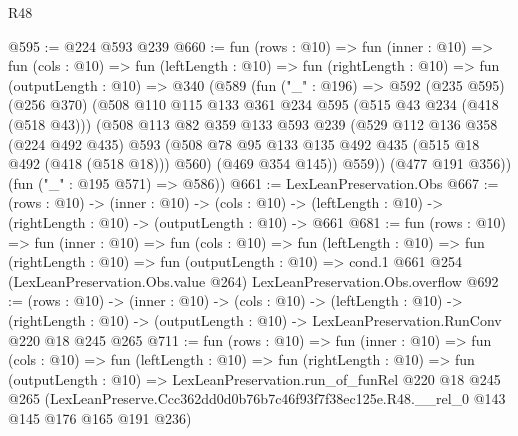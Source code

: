 \begin{lexlean}{R48}
\begin{coremodule}
@595 := @224 @593 @239
@660 := fun (rows : @10) =>
  fun (inner : @10) =>
  fun (cols : @10) =>
  fun (leftLength : @10) =>
  fun (rightLength : @10) =>
  fun (outputLength : @10) =>
  @340
    (@589
      (fun ("_" : @196) =>
      @592
        (@235 @595)
        (@256 @370)
        (@508
          @110
          @115
          @133
          @361
          @234
          @595
          (@515 @43 @234 (@418 (@518 @43)))
          (@508
            @113
            @82
            @359
            @133
            @593
            @239
            (@529
              @112
              @136
              @358
              (@224 @492 @435)
              @593
              (@508 @78 @95 @133 @135 @492 @435 (@515 @18 @492 (@418 (@518 @18))) @560)
              (@469 @354 @145))
            @559))
        (@477 @191 @356))
      (fun ("_" : @195 @571) => @586))
@661 := LexLeanPreservation.Obs
@667 := (rows : @10) ->
  (inner : @10) ->
  (cols : @10) -> (leftLength : @10) -> (rightLength : @10) -> (outputLength : @10) -> @661
@681 := fun (rows : @10) =>
  fun (inner : @10) =>
  fun (cols : @10) =>
  fun (leftLength : @10) =>
  fun (rightLength : @10) =>
  fun (outputLength : @10) =>
  cond.{1} @661 @254 (LexLeanPreservation.Obs.value @264) LexLeanPreservation.Obs.overflow
@692 := (rows : @10) ->
  (inner : @10) ->
  (cols : @10) ->
  (leftLength : @10) ->
  (rightLength : @10) -> (outputLength : @10) -> LexLeanPreservation.RunConv @220 @18 @245 @265
@711 := fun (rows : @10) =>
  fun (inner : @10) =>
  fun (cols : @10) =>
  fun (leftLength : @10) =>
  fun (rightLength : @10) =>
  fun (outputLength : @10) =>
  LexLeanPreservation.run_of_funRel
    @220
    @18
    @245
    @265
    (LexLeanPreserve.Ccc362dd0d0b76b7c46f93f7f38ec125e.R48.__rel_0 @143 @145 @176 @165 @191 @236)
\end{coremodule}
\end{lexlean}
